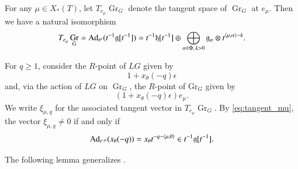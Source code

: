 \documentclass[a4paper, 12pt]{amsart}
\theoremstyle{definition}
\newcommand{\C}{\mathbb C}
\newcommand{\g}{\mathfrak g}
\newcommand{\la}{\langle}
\newcommand{\ra}{\rangle}
\DeclareMathOperator{\Gr}{\mathrm{Gr}}
\begin{document}
For any $\mu\in X_*(T)$, let $T_{e_\mu}\Gr_G$ denote the tangent space of
$\Gr_G$ at $e_\mu$. Then we have a natural isomorphism
\begin{equation}\label{eq:tangent_mu}
T_{e_\mu}\Gr_G
\simeq {\rm Ad}_{t^\mu}(t^{-1}\g[t^{-1}])
\simeq t^{-1}\mathfrak h[t^{-1}]
\oplus\bigoplus_{\alpha\in\Phi,\,k>0}
\g_\alpha\otimes t^{\la\mu,\alpha\ra-k}.
\end{equation}


For $q \geq 1$, consider the $R$-point of $LG$ given by \[1+x_{\theta}(-q) \epsilon\]
and, via the action of $LG$ on $\Gr_G$, the $R$-point of $\mathrm{Gr}_G$ given by 
\begin{equation}\label{eq:infinitesimal}
(1+x_{\theta}(-q) \epsilon) e_{\mu}.
\end{equation}
We write $\xi_{\mu, q}$ for the associated tangent vector in $T_{e_{\mu}} \Gr_G$.
By \eqref{eq:tangent_mu}, the vector
$\xi_{\mu,q}\neq0$ if and only if
\begin{equation}\label{eq:nonzero}
{\rm Ad}_{t^{-\mu}}(x_\theta(-q))
=x_\theta t^{-q-\la\mu,\theta\ra}\in t^{-1}\g[t^{-1}].
\end{equation}

The following lemma generalizes
\cite[Lemma~4.3]{BHY}.
\end{document}
